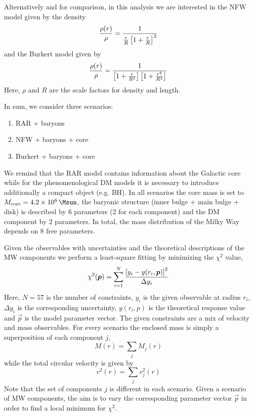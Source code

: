 Alternatively and for comparison, in this analysis we are interested in the NFW model given by the density \citep{1996ApJ...462..563N} \begin{equation}
	\frac{\rho(r)}{\rho} = \frac{1}{\frac{r}{R}\qbracket{1 + \frac{r}{R}}^2}
\end{equation} and the Burkert model given by \citep{1995ApJ...447L..25B} \begin{equation}
	\frac{\rho(r)}{\rho} = \frac{1}{\qbracket{1 + \frac{r}{R^2}}\qbracket{1 + \frac{r^2}{R^2}}}
\end{equation} Here, $\rho$ and $R$ are the scale factors for density and length.

In sum, we consider three scenarios: \begin{enumerate}
\item RAR + baryons
\item NFW + baryons + core
\item Burkert + baryons + core
\end{enumerate} We remind that the RAR model contains information about the Galactic core while for the phenomenological DM models it is necessary to introduce additionally a compact object (e.g. BH). In all scenarios the core mass is set to $M_{\rm core} = \SI{4.2E6}{\Msun}$, the baryonic structure (inner bulge + main bulge + disk) is described by 6 parameters (2 for each component) and the DM component by 2 parameters. In total, the mass distribution of the Milky Way depends on 8 free parameters.

Given the observables with uncertainties and the theoretical descriptions of the MW components we perform a least-square fitting by minimizing the $\chi^2$ value, \begin{equation}
	\chi^2(\vec p) = \sum_{i=1}^N \frac{\qbracket{y_i - y(r_i, \vec p)}^2}{\Delta y_i}
\end{equation} Here, $N=57$ is the number of constraints, $y_i$ is the given observable at radius $r_i$, $\Delta y_i$ is the corresponding uncertainty, $y(r_i, p)$ is the theoretical response value and $\vec p$ is the model parameter vector. The given constraints are a mix of velocity and mass observables.
For every scenario the enclosed mass is simply a superposition of each component $j$, \begin{equation}
	M(r) = \sum_{j} M_j(r)
\end{equation} while the total circular velocity is given by \begin{equation}
	v^2(r) = \sum_{j} v^2_j(r)
\end{equation} Note that the set of components $j$ is different in each scenario. Given a scenario of MW components, the aim is to vary the corresponding parameter vector $\vec p$ in order to find a local minimum for $\chi^2$.




